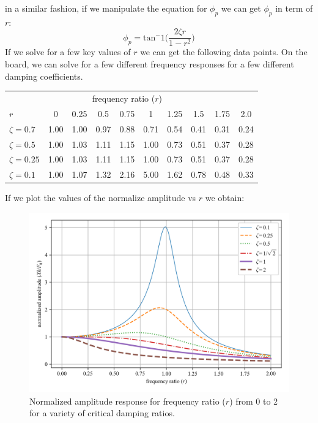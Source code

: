 \documentclass[12pt,letter]{article}
\numberwithin{ex}{section} %
\numberwithin{re}{section} %
\begin{document}
			in a similar fashion, if we manipulate the equation for $\phi_p$ we can get $\phi_p$ in term of $r$:
			\begin{equation}
				\phi_p = \text{tan}^-1\bigg(\frac{2 \zeta r}{1-r^2}\bigg)
			\end{equation}	
			If we solve for a few key values of $r$ we can get the following data points. On the board, we can solve for a few different frequency responses for a few different damping coefficients. 
			\begin{table}[H]
				\centering
				\begin{tabular}{@{}lccccccccc@{}}
				\toprule
				 & & \multicolumn{5}{c}{frequency ratio ($r$)} \\ 
				$r$ & 0 & 0.25& 0.5& 0.75& 1& 1.25& 1.5& 1.75& 2.0 \\ \midrule
				$\zeta=0.7$	&	1.00&  1.00	&   0.97&	0.88&	0.71&	0.54&	0.41&	0.31 & 0.24\\
				$\zeta=0.5$	&	1.00&	1.03&	1.11&	1.15&	1.00&	0.73&	0.51&	0.37 & 0.28\\ 
				$\zeta=0.25$	&	1.00&	1.03&	1.11&	1.15&	1.00&	0.73&	0.51&	0.37 & 0.28 \\ 
				$\zeta=0.1$	&	1.00&	1.07&	1.32&	2.16&	5.00&	1.62&	0.78&	0.48 & 0.33 \\ \bottomrule
				\end{tabular}
			\end{table}
			If we plot the values of the normalize amplitude vs $r$ we obtain:
			\begin{figure}[H]
				\centering
				\includegraphics[]{../Figures/underdamped_frequency_response_amplitude.png}
				\caption{Normalized amplitude response for frequency ratio ($r$) from 0 to 2 for a variety of critical damping ratios.}
			\end{figure}			
\end{document}
